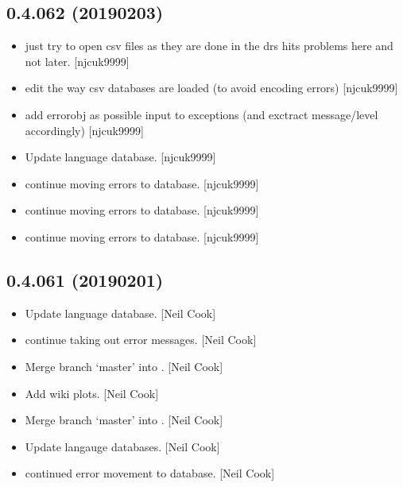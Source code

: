 \documentclass[a4paper,10pt,english]{report}
\begin{document}
\subsection{0.4.062 (2019\sphinxhyphen{}02\sphinxhyphen{}03)}
\label{\detokenize{misc/changelog:id217}}\begin{itemize}
\item {} 
 \sphinxhyphen{} just try to open csv files as they are done in the
drs \textendash{} hits problems here and not later. {[}njcuk9999{]}

\item {} 
 \sphinxhyphen{} edit the way csv databases are loaded (to avoid encoding
errors) {[}njcuk9999{]}

\item {} 
 \sphinxhyphen{} add errorobj as possible input to exceptions (and
exctract message/level accordingly) {[}njcuk9999{]}

\item {} 
Update language database. {[}njcuk9999{]}

\item {} 
 \sphinxhyphen{} continue moving errors to database. {[}njcuk9999{]}

\item {} 
 \sphinxhyphen{} continue moving errors to database. {[}njcuk9999{]}

\item {} 
 \sphinxhyphen{} continue moving errors to database. {[}njcuk9999{]}

\end{itemize}


\subsection{0.4.061 (2019\sphinxhyphen{}02\sphinxhyphen{}01)}
\label{\detokenize{misc/changelog:id218}}\begin{itemize}
\item {} 
Update language database. {[}Neil Cook{]}

\item {} 
 \sphinxhyphen{} continue taking out error messages. {[}Neil Cook{]}

\item {} 
Merge branch ‘master’ into . {[}Neil Cook{]}

\item {} 
Add wiki plots. {[}Neil Cook{]}

\item {} 
Merge branch ‘master’ into . {[}Neil Cook{]}

\item {} 
Update langauge databases. {[}Neil Cook{]}

\item {} 
 \sphinxhyphen{} continued error movement to database. {[}Neil Cook{]}

\end{itemize}
\end{document}

